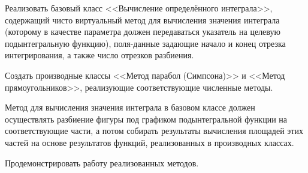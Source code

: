Реализовать базовый класс <<Вычисление определённого
интеграла>>, содержащий чисто виртуальный метод для
вычисления значения интеграла (которому в качестве
		параметра должен передаваться указатель на целевую
		подынтегральную функцию), поля-данные задающие начало
и конец отрезка интегрирования, а также число отрезков
разбиения.

Создать производные классы <<Метод парабол
(Симпсона)>> и <<Метод прямоугольников>>, реализующие
соответствующие численные методы.

Метод для вычисления
значения интеграла в базовом классе должен осуществлять
разбиение фигуры под графиком подынтегральной функции
на соответствующие части, а потом собирать результаты
вычисления площадей этих частей на основе результатов
функций, реализованных в производных классах.

Продемонстрировать работу реализованных методов.
